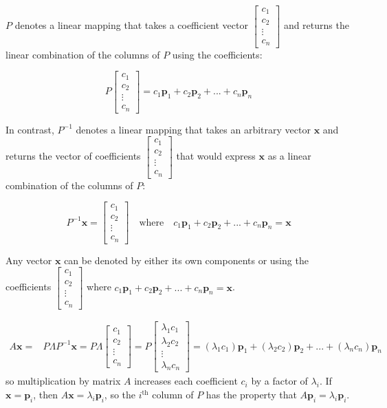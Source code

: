 \documentclass{article}
\begin{document}
\(P\) denotes a linear mapping that takes a coefficient vector \(\begin{bmatrix} c_1 \\ c_2 \\ \vdots \\ c_n \end{bmatrix}\) and returns the linear combination of the columns of \(P\) using the coefficients:

\[P\begin{bmatrix} c_1 \\ c_2 \\ \vdots \\ c_n \end{bmatrix} = c_1\mathbf{p}_1 + c_2\mathbf{p}_2 + ... + c_n\mathbf{p}_n\]

In contrast, \(P^{-1}\) denotes a linear mapping that takes an arbitrary vector \(\mathbf{x}\) and returns the vector of coefficients \(\begin{bmatrix} c_1 \\ c_2 \\ \vdots \\ c_n \end{bmatrix}\) that would express \(\mathbf{x}\) as a linear combination of the columns of \(P\):

\[P^{-1}\mathbf{x} = \begin{bmatrix} c_1 \\ c_2 \\ \vdots \\ c_n \end{bmatrix} \quad\text{where}\quad c_1\mathbf{p}_1 + c_2\mathbf{p}_2 + ... + c_n\mathbf{p}_n = \mathbf{x}\]

Any vector \(\mathbf{x}\) can be denoted by either its own components or using the coefficients \(\begin{bmatrix} c_1 \\ c_2 \\ \vdots \\ c_n \end{bmatrix}\) where \(c_1\mathbf{p}_1 + c_2\mathbf{p}_2 + ... + c_n\mathbf{p}_n = \mathbf{x}\). 

\begin{align*}
A\mathbf{x} = & P\Lambda P^{-1}\mathbf{x} = P\Lambda\begin{bmatrix} c_1 \\ c_2 \\ \vdots \\ c_n \end{bmatrix} = P\begin{bmatrix} \lambda_1 c_1 \\ \lambda_2 c_2 \\ \vdots \\ \lambda_n c_n \end{bmatrix} = (\lambda_1 c_1)\mathbf{p}_1 + (\lambda_2 c_2)\mathbf{p}_2 + ... + (\lambda_n c_n)\mathbf{p}_n
\end{align*}
so multiplication by matrix \(A\) increases each coefficient \(c_i\) by a factor of \(\lambda_i\). If \(\mathbf{x} = \mathbf{p}_i\), then \(A\mathbf{x} = \lambda_i \mathbf{p}_i\), so the \(i^{\text{th}}\) column of \(P\) has the property that \(A\mathbf{p}_i = \lambda_i \mathbf{p}_i\).
\end{document}

